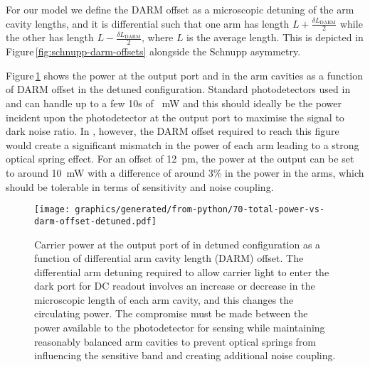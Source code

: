 For our model we define the \gls{DARM} offset as a microscopic detuning of the arm cavity lengths, and it is differential such that one arm has length $L + \frac{\delta L_{\text{DARM}}}{2}$ while the other has length $L - \frac{\delta L_{\text{DARM}}}{2}$, where $L$ is the average length. This is depicted in Figure\,\ref{fig:schnupp-darm-offsets} alongside the Schnupp asymmetry.

Figure\,\ref{fig:total-power-vs-darm-offset-detuned} shows the power at the output port and in the arm cavities as a function of \gls{DARM} offset in the detuned configuration. Standard photodetectors used in \ALIGO{} and \AVIRGO{} can handle up to a few \num{10}s of \SI{}{\milli\watt} and this should ideally be the power incident upon the photodetector at the output port to maximise the signal to dark noise ratio. In \ETLF{}, however, the \gls{DARM} offset required to reach this figure would create a significant mismatch in the power of each arm leading to a strong optical spring effect. For an offset of \SI{12}{\pico\meter}, the power at the output can be set to around \SI{10}{\milli\watt} with a difference of around 3\% in the power in the arms, which should be tolerable in terms of sensitivity and noise coupling.

\begin{figure}
  \centering
  \texttt{[image: graphics/generated/from-python/70-total-power-vs-darm-offset-detuned.pdf]}
  \caption[Carrier power at the output port of \ETLF{} in detuned configuration as a function of differential arm cavity offset]{\label{fig:total-power-vs-darm-offset-detuned}Carrier power at the output port of \ETLF{} in detuned configuration as a function of differential arm cavity length (\gls{DARM}) offset. The differential arm detuning required to allow carrier light to enter the dark port for \gls{DC} readout involves an increase or decrease in the microscopic length of each arm cavity, and this changes the circulating power. The compromise must be made between the power available to the photodetector for sensing while maintaining reasonably balanced arm cavities to prevent optical springs from influencing the sensitive band and creating additional noise coupling.}
\end{figure}

